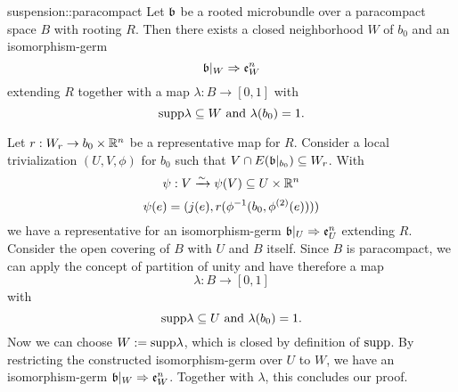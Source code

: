\begin{mylemma}{suspension::paracompact}
    Let $\mathfrak{b}$ be a rooted microbundle over a paracompact space $B$ with rooting $R$.
    Then there exists a closed neighborhood $W$ of $b_0$ and an isomorphism-germ
    \[ \mathfrak{b}\vert_{W} \Rightarrow{}{} \mathfrak{e}^{n}_W \]
    extending $R$ together with a map $\lambda: B \to [0, 1]$ with
    \[ \text{supp}\lambda \subseteq{} W \text{ and } \lambda(b_0) = 1. \]
\end{mylemma}

\begin{myproof}
    Let $r: W_r \to b_0 \times \mathbb{R}^n$ be a representative map for $R$.
    Consider a local trivialization $(U, V, \phi)$ for $b_0$ such that $V \cap E(\mathfrak{b}\vert_{b_0}) \subseteq{} W_r$. %
    With
    \[ \psi: V \xrightarrow{\sim} \psi(V) \subseteq{} U \times \mathbb{R}^n \]
    \[ \psi(e) = (j(e), r(\phi^{-1}(b_0, \phi^{(2)}(e)))) \]
    we have a representative for an isomorphism-germ $\mathfrak{b}\vert_{U} \Rightarrow{}{} \mathfrak{e}^{n}_U$ extending $R$.
    Consider the open covering of $B$ with $U$ and $B$ itself.
    Since $B$ is paracompact, we can apply the concept of partition of unity and have therefore a map
    \[ \lambda: B \to [0, 1] \]
    with 
    \[ \text{supp}\lambda \subseteq{} U \text{ and } \lambda(b_0) = 1. \]
    Now we can choose $W := \text{supp}\lambda$, which is closed by definition of $\text{supp}$.
    By restricting the constructed isomorphism-germ over $U$ to $W$, we have an isomorphism-germ $\mathfrak{b}\vert_{W} \Rightarrow{}{} \mathfrak{e}^{n}_W$.
    Together with $\lambda$, this concludes our proof.
\end{myproof}

